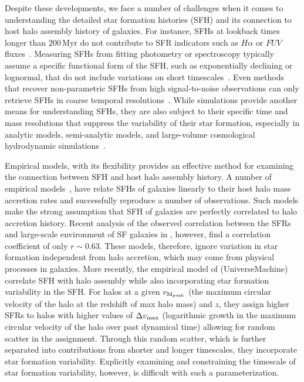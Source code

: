 \documentclass[12pt, letterpaper, preprint, tighten]{aastex62}
\begin{document}
Despite these developments, we face a number of challenges when it comes 
to understanding the detailed star formation histories (SFH) and its 
connection to host halo assembly history of galaxies. 
For instance, SFHs at lookback times longer than $200\,\mathrm{Myr}$ 
do not contribute to SFR indicators such as $H\alpha$ or $FUV$ fluxes~\cite{sparre2017}.
Measuring SFHs from fitting photometry or spectroscopy typically 
assume a specific functional form of the SFH, such as exponentially 
declining or lognormal, that do not include variations on short 
timescales~\citep[\emph{e.g.}][]{wilkinson2017, carnall2018}. 
Even methods that recover non-parametric SFHs from high signal-to-noise 
observations can only retrieve SFHs in coarse temporal resolutions~\citep[\emph{e.g.}][]{tojeiro2009, leja2018a}. 
While simulations provide another means for understanding SFHs, 
they are also subject to their specific time and mass resolutions that 
suppress the variability of their star formation, especially in 
analytic models, semi-analytic models, and large-volume cosmological 
hydrodynamic simulations~\citep[][see also Figure~\ref{fig:illustris_sfh}]{sparre2015, sparre2017}.

Empirical models, with its flexibility provides an effective method for
examining the connection between SFH and host halo assembly history. A 
number of empirical models~\citep{taghizadeh-popp2015, becker2015, rodriguez-puebla2016a, mitra2017, cohn2017, moster2017}, 
have relate SFHs of galaxies linearly to their host halo mass accretion 
rates and successfully reproduce a number of observations. Such models 
make the strong assumption that SFH of galaxies are perfectly correlated 
to halo accretion history. Recent analysis of the observed correlation 
between the SFRs and large-scale environment of SF galaxies in \cite{tinker2018b}, 
however, find a correlation coefficient of only $r \sim 0.63$. These models, 
therefore, ignore variation in star formation independent from halo accretion, 
which may come from physical processes in galaxies. More recently, the empirical
model of \cite{behroozi2018} ({\sc UniverseMachine}) correlate SFH 
with halo assembly while also incorporating star formation variability in 
the SFH. For halos at a given $v_{\rm M_{peak}}$ (the maximum circular 
velocity of the halo at the redshift of max halo mass) and $z$, they 
assign higher SFRs to halos with higher values of $\Delta v_{\rm max}$ 
(logarithmic growth in the maximum circular velocity of the halo over past dynamical time)
allowing for random scatter in the assignment. Through this random scatter, 
which is further separated into contributions from shorter and longer timescales, 
they incorporate star formation variability. Explicitly examining and constraining 
the timescale of star formation variability, however, is difficult with such a 
parameterization.  
\end{document}
